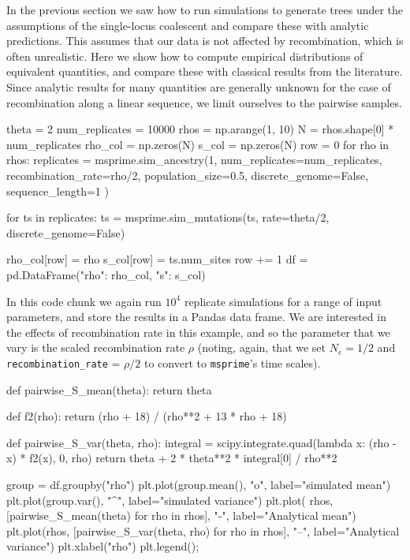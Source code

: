 \documentclass[graybox]{svmult}
\newcommand{\msprime}[0]{\texttt{msprime}}
\begin{document}
In the previous section we saw how to run simulations to generate trees
under the assumptions of the single-locus coalescent and compare these
with analytic predictions. This assumes that our data is not affected
by recombination, which is often unrealistic. Here we show how to
compute empirical distributions of equivalent quantities, and compare
these with classical results from the literature. Since analytic
results for many quantities are generally unknown for the case of recombination along a linear sequence, we limit ourselves to the pairwise samples.

\begin{pythoncode}
theta = 2
num_replicates = 10000
rhos = np.arange(1, 10)
N = rhos.shape[0] * num_replicates
rho_col = np.zeros(N)
s_col = np.zeros(N)
row = 0
for rho in rhos:
    replicates = msprime.sim_ancestry(1, num_replicates=num_replicates,
                                        recombination_rate=rho/2, population_size=0.5,
                                        discrete_genome=False, sequence_length=1
                                     )

    for ts in replicates:
        ts = msprime.sim_mutations(ts, rate=theta/2, discrete_genome=False)

        rho_col[row] = rho
        s_col[row] = ts.num_sites
        row += 1
df = pd.DataFrame({"rho": rho_col, "s": s_col})
\end{pythoncode}

In this code chunk we again run $10^4$ replicate simulations for a range
of input parameters, and store the results in a Pandas data frame. We
are interested in the effects of recombination rate in this example,
and so the parameter that we vary is the scaled recombination rate
$\rho$ (noting, again, that we set $N_e = 1/2$ and
\texttt{recombination\_rate} = $\rho / 2$ to convert to \msprime's
time scales).

\begin{pythoncode}
def pairwise_S_mean(theta):
    return theta

def f2(rho):
    return (rho + 18) / (rho**2 + 13 * rho + 18)

def pairwise_S_var(theta, rho):
    integral = scipy.integrate.quad(lambda x: (rho - x) * f2(x), 0, rho)
    return theta + 2 * theta**2 * integral[0] / rho**2

group = df.groupby("rho")
plt.plot(group.mean(), "o", label="simulated mean")
plt.plot(group.var(), "^", label="simulated variance")
plt.plot(
    rhos, [pairwise_S_mean(theta) for rho in rhos], "-",
    label="Analytical mean")
plt.plot(rhos, [pairwise_S_var(theta, rho) for rho in rhos], "--",
label="Analytical variance")
plt.xlabel("rho")
plt.legend();
\end{pythoncode}
\end{document}
